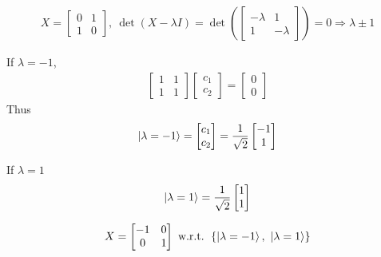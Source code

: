 
\begin{align*}
	X = \begin{bmatrix}
	0 & 1 \\ 
	1 & 0
	\end{bmatrix},\ \det(X-\lambda I) =
	\det \left(\begin{bmatrix}
	-\lambda & 1 \\ 
	1 & -\lambda
	\end{bmatrix} \right) = 0 \Rightarrow \lambda \pm 1
\end{align*}

If $\lambda = -1$,
\begin{align*}
	\begin{bmatrix}
		1 & 1 \\ 
		1 & 1
	\end{bmatrix}
	\begin{bmatrix}
		c_1 \\ 
		c_2
	\end{bmatrix} =
	\begin{bmatrix}
		0 \\ 
		0
	\end{bmatrix}
\end{align*}
Thus
\begin{align*}
	\ket{\lambda = -1} = \begin{bmatrix}
	c_1 \\ 
	c_2
	\end{bmatrix} = \frac{1}{\sqrt{2}}
	\begin{bmatrix}
	-1 \\ 
	1
	\end{bmatrix}
\end{align*}

If $\lambda = 1$
\begin{align*}
	\ket{\lambda = 1} = \frac{1}{\sqrt{2}}
	\begin{bmatrix}
	1 \\ 
	1
	\end{bmatrix}
\end{align*}

\begin{align*}
	X = \begin{bmatrix}
	-1 & 0 \\ 
	0 & 1
	\end{bmatrix}
	\text{ w.r.t. } \left\{ \ket{\lambda = -1},\ \ket{\lambda = 1}\right\}
\end{align*}




